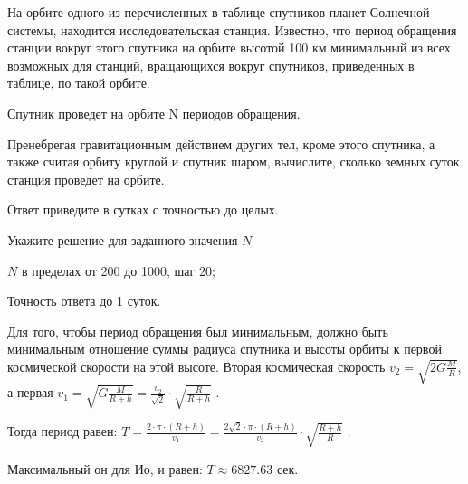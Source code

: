 На орбите одного из перечисленных в таблице спутников планет Солнечной системы, находится исследовательская станция. Известно, что период обращения станции вокруг этого спутника на орбите высотой 100 км минимальный из всех возможных для станций, вращающихся вокруг спутников, приведенных в таблице, по такой орбите.


Спутник проведет на орбите N периодов обращения. 

Пренебрегая гравитационным действием других тел, кроме этого
спутника, а также считая орбиту круглой и спутник шаром, вычислите, сколько
земных суток станция проведет на орбите. 

Ответ приведите в сутках с точностью до целых.

Укажите решение для заданного значения $N$

\paramSection

$N$ в пределах от 200 до 1000, шаг 20;         

Точность ответа  до  1  суток.

\solutionSection

Для того, чтобы период обращения был минимальным, должно быть минимальным отношение суммы радиуса спутника  
и высоты орбиты к первой космической скорости на этой высоте. Вторая космическая скорость $v_2=\sqrt{2G \frac{M}{R}}$, 
а первая  $v_1=\sqrt{G \frac{M}{R+h}}=\frac{v_2}{\sqrt{2}} \cdot \sqrt{\frac{R}{R+h}}$ .

Тогда период равен:  $T=\frac{2 \cdot \pi \cdot (R+h)}{  v_1 }=\frac{2\sqrt{2} \cdot \pi \cdot (R+h)}{v_2}  \cdot \sqrt{\frac{R+h}{R}}$ .

Максимальный он для Ио, и равен:  $ T \approx 6827.63$ сек.


